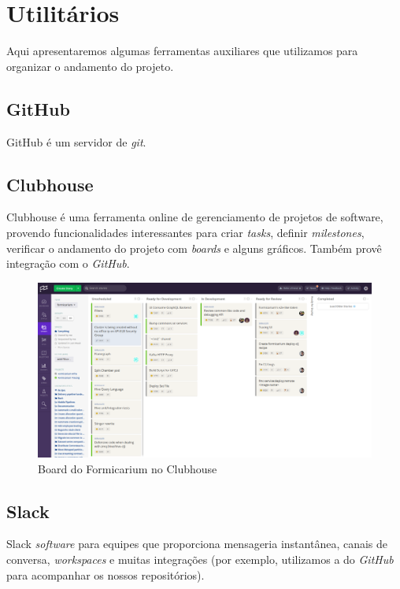 \section{Utilitários}
Aqui apresentaremos algumas ferramentas auxiliares que utilizamos para organizar o andamento do projeto.

\subsection{GitHub}
GitHub \cite{github} é um servidor de \textit{git}.

\subsection{Clubhouse}
Clubhouse \cite{clubhouse} é uma ferramenta online de gerenciamento de projetos de software, provendo funcionalidades interessantes para criar \textit{tasks}, definir \textit{milestones}, verificar o andamento do projeto com \textit{boards} e alguns gráficos. Também provê integração com o \textit{GitHub}.

\begin{figure}[htb]
    \caption{Board do Formicarium no Clubhouse}
    \begin{center}
        \includegraphics[scale=0.20]{pictures/clubhouse-fmc.png}
    \end{center}
    \label{fig:clubhouse}
\end{figure}

\subsection{Slack}
Slack \cite{slack} \textit{software} para equipes que proporciona mensageria instantânea, canais de conversa, \textit{workspaces} e muitas integrações (por exemplo, utilizamos a do \textit{GitHub} para acompanhar os nossos repositórios).
